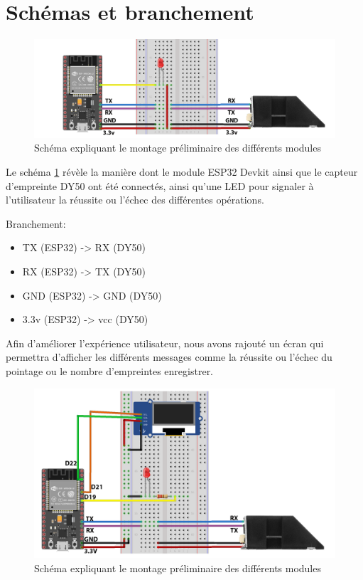 \section{Schémas et branchement}

 \begin{figure}[h!]
    \centering
    \includegraphics[scale=0.24]{images/schema/montage_illustration.png}
    \caption{Schéma expliquant le montage préliminaire des différents modules  }
    \label{fig52}
\end{figure}
\clearpage
Le schéma \ref{fig52} révèle la manière dont le module ESP32 Devkit ainsi que le 
capteur d’empreinte DY50 ont été connectés, ainsi qu’une LED pour signaler à 
l’utilisateur la réussite ou l’échec des différentes opérations.
 
Branchement: 

\begin{itemize}
    \item [\textbullet]TX (ESP32) -> RX (DY50)
    \item [\textbullet]RX (ESP32) -> TX (DY50)
    \item [\textbullet]GND (ESP32) -> GND (DY50) 
    \item [\textbullet]3.3v (ESP32) -> vcc (DY50)    
\end{itemize}            

Afin d’améliorer l’expérience utilisateur, nous avons rajouté un écran qui 
permettra d’afficher les différents messages comme la réussite ou l’échec 
du pointage ou le nombre d’empreintes enregistrer.

\begin{figure}[h!]
    \centering
    \includegraphics[scale=0.2]{images/schema/schemat v3 sans uvc.png}
    \caption{Schéma expliquant le montage préliminaire des différents modules}
    \label{fig53}
\end{figure}

